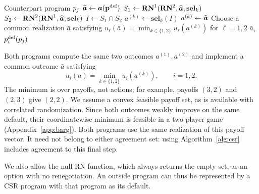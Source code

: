 \documentclass[sigconf]{aamas}
\newcommand{\selection}{sel}%
\newcommand{\renegb}{\mathbf{\selection}}
\theoremstyle{definition}
\begin{document}
\begin{algorithm}
\caption{Conditional set-valued renegotiation program
$\progi\in\fsspaceireni$, with default $\defprogi$ and selector $\renegb_i$}
\label{alg:csr}
\begin{algorithmic}[1]
\Require Counterpart program $p_j$
\If{$\progj\in\fsspacej(\renegj)$ with stored selector $\renegb_j$}
    \State $\widehat{\boldsymbol{a}}\gets\boldsymbol{a}({\textbf{p}}^{\textnormal{def}})$
        \State $S_1\gets\renegone(\renegtwo,\deffullact,\renegb_k)$
        \State $S_2\gets\renegtwo(\renegone,\deffullact,\renegb_k)$
        \State $I\gets S_1\cap S_2$
            \State $a^{(k)}\gets\renegb_k(I)$
        \Else
            \State $a^{(k)}\gets\widehat{\boldsymbol{a}}$
        \EndIf
    \EndFor
    \State Choose a common realization $\bar a$ satisfying
    \Statex \hspace{\algorithmicindent}
        $u_\ell(\bar a)=\min_{k\in\{1,2\}}u_\ell(a^{(k)})$ for $\ell=1,2$
    \State \Return $\bar a_i$
\Else
    \State \Return $p_i^{\textnormal{def}}(p_j)$
\EndIf
\end{algorithmic}
\end{algorithm}

\label{sec:branch-aggregate}
Both programs compute the same two outcomes $a^{(1)},a^{(2)}$ and
implement a common outcome $\bar a$ satisfying
\begin{equation}\label{eq:branch-aggregate}
 u_i(\bar a)=\min_{k\in\{1,2\}}u_i(a^{(k)}),\qquad i=1,2.
\end{equation}
The minimum is over payoffs, not actions; for example, payoffs
$(3,2)$ and $(2,3)$ give $(2,2)$. We assume a convex feasible payoff
set, as is available with correlated randomization. Since both
outcomes weakly improve on the same default, their coordinatewise
minimum is feasible in a two-player game (Appendix~\ref{app:barg}).
Both programs use the same realization of this payoff vector.
It need not belong to either agreement set: using
Algorithm~\ref{alg:csr} includes agreement to this final step.

We also allow the null RN function, which always returns the empty
set, as an option with no renegotiation. An outside program can thus
be represented by a CSR program with that program as its default.
\end{document}
